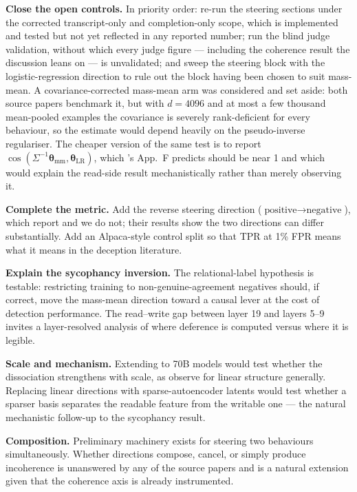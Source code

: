 \documentclass[conference]{IEEEtran}
\begin{document}
\textbf{Close the open controls.} In priority order: re-run the steering sections
under the corrected transcript-only and completion-only scope, which is
implemented and tested but not yet reflected in any reported number; run the blind
judge validation, without which every judge figure --- including the coherence
result the discussion leans on --- is unvalidated; and sweep the steering block
with the logistic-regression direction to rule out the block having been chosen to
suit mass-mean. A covariance-corrected mass-mean arm was considered and set aside:
both source papers benchmark it, but with $d=4096$ and at most a few thousand
mean-pooled examples the covariance is severely rank-deficient for every behaviour,
so the estimate would depend heavily on the pseudo-inverse regulariser. The cheaper
version of the same test is to report
$\cos(\Sigma^{-1}\boldsymbol{\theta}_{\mathrm{mm}}, \boldsymbol{\theta}_{\mathrm{LR}})$,
which \citeauthor{marks2024}'s App.~F predicts should be near 1 and which would
explain the read-side result mechanistically rather than merely observing it.

\textbf{Complete the metric.} Add the reverse steering direction
($\text{positive}\!\to\!\text{negative}$), which \citeauthor{marks2024} report
and we do not; their results show the two directions can differ substantially.
Add an Alpaca-style control split so that TPR at 1\% FPR means what it means in
the deception literature.

\textbf{Explain the sycophancy inversion.} The relational-label hypothesis is
testable: restricting training to non-genuine-agreement negatives should, if
correct, move the mass-mean direction toward a causal lever at the cost of
detection performance. The read--write gap between layer 19 and layers 5--9
invites a layer-resolved analysis of where deference is computed versus where it
is legible.

\textbf{Scale and mechanism.} Extending to 70B models would test whether the
dissociation strengthens with scale, as \citeauthor{marks2024} observe for
linear structure generally. Replacing linear directions with sparse-autoencoder
latents \citep{cunningham2023,bricken2023} would test whether a sparser basis
separates the readable feature from the writable one --- the natural mechanistic
follow-up to the sycophancy result.

\textbf{Composition.} Preliminary machinery exists for steering two behaviours
simultaneously. Whether directions compose, cancel, or simply produce
incoherence is unanswered by any of the source papers and is a natural extension
given that the coherence axis is already instrumented.
\end{document}
